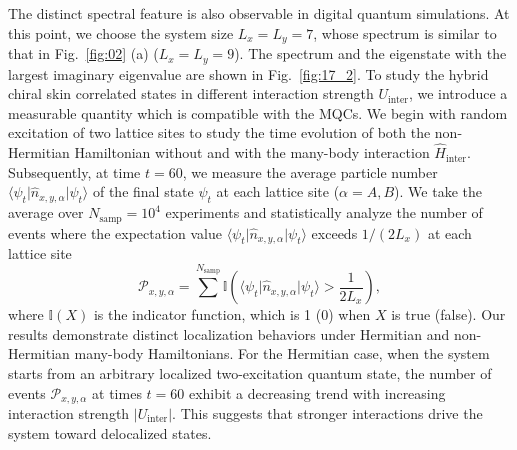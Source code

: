\documentclass[longbibliography, aps, prx, amsmath, amssymb, amsfonts, twocolumn,superscriptaddress, footinbib]{revtex4-1}
\begin{document}
	The distinct spectral feature is also observable in digital quantum simulations. At this point, we choose the system size $L_x=L_y=7$, whose spectrum is similar to that in Fig.~\ref{fig:02} (a) ($L_x=L_y=9$). The spectrum and the eigenstate with the largest imaginary eigenvalue are shown in Fig.~\ref{fig:17_2}.
	To study the hybrid chiral skin correlated states in different interaction strength $U_{\text{inter}}$, we introduce a measurable quantity which is compatible with the MQCs. %
	{}
    We begin with random excitation of two lattice sites to
	study the time evolution of both the non-Hermitian Hamiltonian without and with the many-body interaction $\hat{H}_{\text{inter}}$. 
	Subsequently, at time $t=60$, we measure the average particle number $\langle \psi_{t} \vert \hat{n}_{x,y,\alpha} \vert \psi_t \rangle$ of the final state $\psi_t$ at each lattice site ($\alpha=A,B$). We take the average over $N_{\text{samp}}=10^4$ experiments and statistically analyze the number of events where the expectation value $\langle \psi_{t} \vert \hat{n}_{x,y,\alpha} \vert \psi_t \rangle$ exceeds $1/(2L_x)$ at each lattice site
	\begin{equation}
		\mathcal{P}_{{x}, {y}, {\alpha}} = \sum^{N_{\text{samp}}} \mathbb{I}(\langle \psi_{t} \vert \hat{n}_{x,y,\alpha} \vert \psi_t \rangle > \frac{1}{2L_x}), \label{eq:NumbEvent}
	\end{equation}
	where $\mathbb{I}(X)$ is the indicator function, which is 1 (0) when $X$ is true (false).%
	Our results demonstrate distinct localization behaviors under Hermitian and non-Hermitian many-body Hamiltonians. For the Hermitian case, when the system starts from an arbitrary localized two-excitation quantum state, the number of events $\mathcal{P}_{x,y,\alpha}$ at times $t=60$ exhibit a decreasing trend with increasing interaction strength $\vert U_{\text{inter}} \vert$. This suggests that stronger interactions drive the system toward delocalized states.
\end{document}
